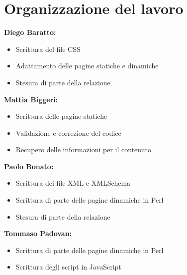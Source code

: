 \documentclass{article}
\begin{document}
 \newpage


\appendix
	\section{Organizzazione del lavoro}
	
	\textbf{Diego Baratto:}\\
	\begin{itemize}
	\item Scrittura del file CSS
	\item Adattamento delle pagine statiche e dinamiche
	\item Stesura di parte della relazione
	\end{itemize}
\textbf{Mattia Biggeri:}\\
	\begin{itemize}
	\item Scrittura delle pagine statiche
	\item Validazione e correzione del codice
	\item Recupero delle informazioni per il contenuto
	\end{itemize}
\textbf{Paolo Bonato:}\\
	\begin{itemize}
	\item Scrittura dei file XML e XMLSchema
	\item Scrittura di parte delle pagine dinamiche in Perl
	\item Stesura di parte della relazione
	\end{itemize}
\textbf{Tommaso Padovan:}\\
	\begin{itemize}
	\item Scrittura di parte delle pagine dinamiche in Perl
	\item Scrittura degli script in JavaScript
	\end{itemize}
\end{document}
